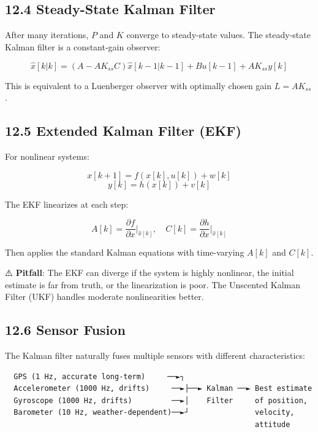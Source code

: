 \documentclass[11pt,a4paper]{book}
\begin{document}
\begin{itemize}
\medskip\noindent\hrulefill\medskip

\subsection{12.4 Steady-State Kalman Filter}

After many iterations, $P$ and $K$ converge to steady-state values. The steady-state Kalman filter is a constant-gain observer:

\[\hat{x}[k|k] = (A - AK_{ss}C)\hat{x}[k-1|k-1] + Bu[k-1] + AK_{ss}y[k]\]

This is equivalent to a Luenberger observer with optimally chosen gain $L = AK_{ss}$.

\medskip\noindent\hrulefill\medskip

\subsection{12.5 Extended Kalman Filter (EKF)}

For nonlinear systems:

\[x[k+1] = f(x[k], u[k]) + w[k]\]
\[y[k] = h(x[k]) + v[k]\]

The EKF linearizes at each step:

\[A[k] = \frac{\partial f}{\partial x}\bigg|_{\hat{x}[k]}, \quad C[k] = \frac{\partial h}{\partial x}\bigg|_{\hat{x}[k]}\]

Then applies the standard Kalman equations with time-varying $A[k]$ and $C[k]$.

⚠️ \textbf{Pitfall}: The EKF can diverge if the system is highly nonlinear, the initial estimate is far from truth, or the linearization is poor. The Unscented Kalman Filter (UKF) handles moderate nonlinearities better.

\medskip\noindent\hrulefill\medskip

\subsection{12.6 Sensor Fusion}

The Kalman filter naturally fuses multiple sensors with different characteristics:

\begin{lstlisting}
  GPS (1 Hz, accurate long-term)     ──►┐
  Accelerometer (1000 Hz, drifts)     ──►├──► Kalman ──► Best estimate
  Gyroscope (1000 Hz, drifts)         ──►│    Filter     of position,
  Barometer (10 Hz, weather-dependent)──►┘               velocity,
                                                         attitude
\end{lstlisting}


\end{itemize}
\end{document}
